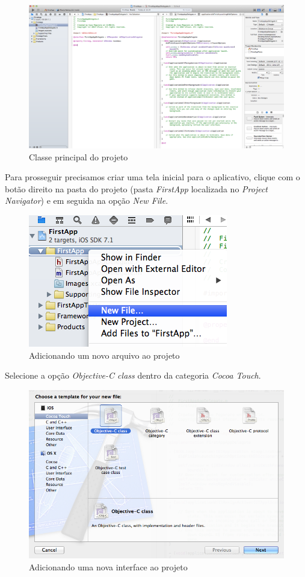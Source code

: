 \documentclass[a4paper,12pt,brazil,oneside]{book}
\begin{document}
\begin{figure}[H]
  \centering
  \includegraphics[width=.99\textwidth]{figuras/3/tela_novo_projeto_5.png}
  \caption{Classe principal do projeto}
  \label{fig:a}
\end{figure}


Para prosseguir precisamos criar uma tela inicial para o aplicativo, clique com o botão direito na pasta do projeto (pasta \emph{FirstApp} localizada no \emph{Project Navigator}) e em seguida na opção \emph{New File}.

\begin{figure}[H]
  \centering
  \includegraphics[width=.35\textwidth]{figuras/3/tela_novo_projeto_6.png}
  \caption{Adicionando um novo arquivo ao projeto}
  \label{fig:a}
\end{figure}


Selecione a opção \emph{Objective-C class} dentro da categoria \emph{Cocoa Touch}.

\begin{figure}[H]
  \centering
  \includegraphics[width=.75\textwidth]{figuras/3/tela_novo_projeto_7.png}
  \caption{Adicionando uma nova interface ao projeto}
  \label{fig:a}
\end{figure}
\end{document}
